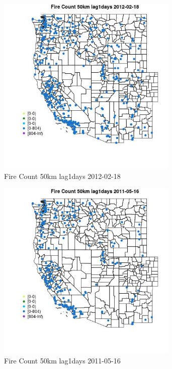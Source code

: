 \begin{figure} 
\centering  
\includegraphics[width=0.77\textwidth]{Code_Outputs/Report_ML_input_PM25_Step4_part_f_de_duplicated_aves_prioritize_24hr_obswNAs_MapObsFire_Count_50km_lag1days2012-02-18.jpg} 
\caption{\label{fig:Report_ML_input_PM25_Step4_part_f_de_duplicated_aves_prioritize_24hr_obswNAsMapObsFire_Count_50km_lag1days2012-02-18}Fire Count 50km lag1days 2012-02-18} 
\end{figure} 
 

\clearpage 

\begin{figure} 
\centering  
\includegraphics[width=0.77\textwidth]{Code_Outputs/Report_ML_input_PM25_Step4_part_f_de_duplicated_aves_prioritize_24hr_obswNAs_MapObsFire_Count_50km_lag1days2011-05-16.jpg} 
\caption{\label{fig:Report_ML_input_PM25_Step4_part_f_de_duplicated_aves_prioritize_24hr_obswNAsMapObsFire_Count_50km_lag1days2011-05-16}Fire Count 50km lag1days 2011-05-16} 
\end{figure} 
 

